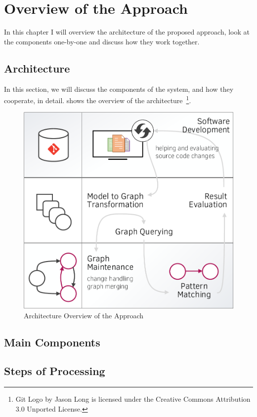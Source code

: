 \chapter{Overview of the Approach}
\label{chap:overview-of-the-approach}

In this chapter I will overview the architecture of the proposed approach, look at the components one-by-one and discuss how they work together.

\section{Architecture}
\label{sect:architecture}

In this section, we will discuss the components of the system, and how they cooperate,
in detail.  shows the overview of the architecture~\footnote{Git Logo by Jason Long is licensed under the Creative Commons Attribution 3.0 Unported License.}.

\begin{figure}[!htb]
  \centering
  \includegraphics[width=\textwidth]{include/figures/architecture.pdf}
  \caption{Architecture Overview of the Approach}
  \label{fig:architecture-overview}
\end{figure}

\section{Main Components}

\section{Steps of Processing}
